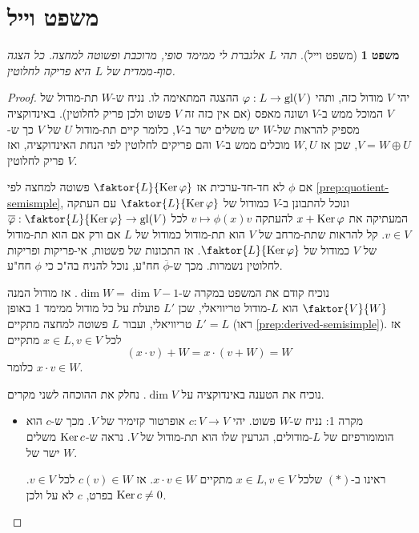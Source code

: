 \documentclass{report}
\theoremstyle{break}
\newtheorem{theorem}{משפט}[chapter]
\theoremstyle{MyNonumberbreak}
\newtheorem{proof}{הוכחה}
\begin{document}
\section{משפט וייל}
\begin{theorem}[משפט וייל]
	תהי $L$ אלגברת לי ממימד סופי, מרוכבת ופשוטה למחצה. כל הצגה סוף-ממדית של $L$ היא פריקה לחלוטין.
\end{theorem}
\begin{proof}
	יהי $V$ מודול כזה, ותהי $\varphi : L \to \operatorname{gl}(V)$ ההצגה המתאימה לו. נניח ש-$W$ תת-מודול של $V$ המוכל ממש ב-$V$ ושונה מאפס (אם אין כזה זה $V$ פשוט ולכן פריק לחלוטין). באינדוקציה מספיק להראות של-$W$ יש משלים ישר ב-$V$, כלומר קיים תת-מודול $U$ של $V$ כך ש-$V = W \oplus U$, שכן אז $W, U$ מוכלים ממש ב-$V$ והם פריקים לחלוטין לפי הנחת האינדוקציה, ואז $V$ פריק לחלוטין.
	
	אם $\phi$ לא חד-חד-ערכית אז $\faktor{L}{\Ker\phi}$ פשוטה למחצה לפי \autoref*{prep:quotient-semismple}, ונוכל להתבונן ב-$V$ כמודול של $\faktor{L}{\Ker\phi}$ עם העתקה \\$\overline{\phi} : \faktor{L}{\Ker\phi} \to \gl(V)$ המעתיקה את $x + \operatorname{Ker}\varphi$ להעתקה $v \mapsto \phi(x)v$ לכל $v \in V$. קל להראות שתת-מרחב של $V$ הוא תת-מודול כמודול של $L$ אם ורק אם הוא תת-מודול של $V$ כמודול של $\faktor{L}{\Ker\phi}$. אז התכונות של פשטות, אי-פריקות ופריקות לחלוטין נשמרות. מכך ש-$\overline{\phi}$ חח"ע, נוכל להניח בה"כ כי $\phi$ חח"ע.
	
	נוכיח קודם את המשפט במקרה ש-$\dim W = \dim V - 1$. אז מודול המנה $\faktor{V}{W}$ הוא $L$-מודול טריוויאלי, שכן $L'$ פועלת על כל מודול ממימד 1 באופן טריוויאלי, ועבור $L$ פשוטה למחצה מתקיים $L' = L$ (ראו \autoref*{prep:derived-semisimple}). אז לכל $x \in L, v \in V$ מתקיים
	\begin{equation*}
		(x \cdot v) + W = x \cdot (v + W) = W \tag{$*$}
	\end{equation*}
	כלומר $x \cdot v \in W$.
	
	נוכיח את הטענה באינדוקציה על $\dim V$. נחלק את ההוכחה לשני מקרים.
	\begin{itemize}
		\item 
		מקרה 1: נניח ש-$W$ פשוט. יהי $c : V \to V$ אופרטור קזימיר של $V$. מכך ש-$c$ הוא הומומורפיזם של $L$-מודולים, הגרעין שלו הוא תת-מודול של $V$. נראה ש-$\operatorname{Ker} c$ משלים ישר של $W$.
		
		ראינו ב-$(*)$ שלכל $x \in L, v \in V$ מתקיים $x \cdot v \in W$. אז $c(v) \in W$ לכל $v \in V$. בפרט, $c$ לא על ולכן $\operatorname{Ker} c \neq 0$.
		

\end{itemize}
\end{proof}
\end{document}

